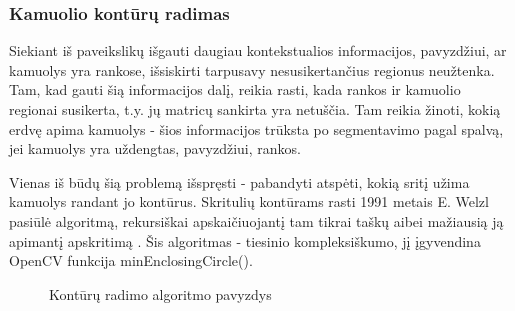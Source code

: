 \documentclass{VUMIFPSbakalaurinis}
\begin{document}
\subsubsection{Kamuolio kontūrų radimas}

Siekiant iš paveikslikų išgauti daugiau kontekstualios informacijos, pavyzdžiui, ar kamuolys yra rankose, išsiskirti tarpusavy nesusikertančius regionus neužtenka. Tam, kad gauti šią informacijos dalį, reikia rasti, kada rankos ir kamuolio regionai susikerta, t.y. jų matricų sankirta yra netuščia. Tam reikia žinoti, kokią erdvę apima kamuolys - šios informacijos trūksta po segmentavimo pagal spalvą, jei kamuolys yra uždengtas, pavyzdžiui, rankos. 

Vienas iš būdų šią problemą išspręsti - pabandyti atspėti, kokią sritį užima kamuolys randant jo kontūrus. Skritulių kontūrams rasti 1991 metais E. Welzl pasiūlė algoritmą, rekursiškai apskaičiuojantį tam tikrai taškų aibei mažiausią ją apimantį apskritimą \cite{Welzl91smallestenclosing}. Šis algoritmas - tiesinio kompleksiškumo, jį įgyvendina OpenCV funkcija minEnclosingCircle().       

\begin{figure}[H]
	\centering
	\qquad
	\caption{Kontūrų radimo algoritmo pavyzdys}
	\label{fig:example}
\end{figure}
\end{document}
